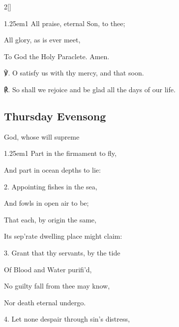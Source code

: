 \begin{paracol}{2}[]
\begin{hangparas}{1.25em}{1}
All praise, eternal Son, to thee;

All glory, as is ever meet,

To God the Holy Paraclete. Amen.\\
\end{hangparas}

℣. O satisfy us with thy mercy, and that soon.

℟. So shall we rejoice and be glad all the days of our life.


\switchcolumn

\subsection{Thursday Evensong}\label{ThursdayEvensong}

 God, whose will supreme


\begin{hangparas}{1.25em}{1}
Part in the firmament to fly,

And part in ocean depths to lie:\\

\vspace{-0.25\baselineskip}

2. Appointing fishes in the sea,

And fowls in open air to be;

That each, by origin the same,

Its sep'rate dwelling place might claim:\\

\vspace{-0.25\baselineskip}

3. Grant that thy servants, by the tide

Of Blood and Water purifi'd,

No guilty fall from thee may know,

Nor death eternal undergo.\\

\vspace{-0.25\baselineskip}

4. Let none despair through sin's distress,


\end{hangparas}
\end{paracol}
